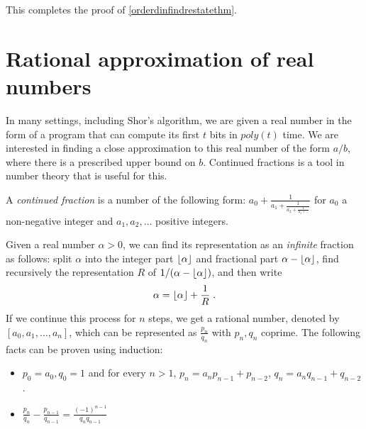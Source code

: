 This completes the proof of \cref{orderdinfindrestatethm}.

\section{Rational approximation of real
numbers}\label{21-Rational-approximation}

In many settings, including Shor's algorithm, we are given a real number
in the form of a program that can compute its first \(t\) bits in
\(poly(t)\) time. We are interested in finding a close approximation to
this real number of the form \(a/b\), where there is a prescribed upper
bound on \(b\). Continued fractions is a tool in number theory that is
useful for this.

A \emph{continued fraction} is a number of the following form:
\(a_0 + \frac{1}{a_1 + \frac{1}{a_2 + \tfrac{1}{a_3 + \ldots}} }\) for
\(a_0\) a non-negative integer and \(a_1,a_2,\ldots\) positive integers.

Given a real number \(\alpha>0\), we can find its representation as an
\emph{infinite} fraction as follows: split \(\alpha\) into the integer
part \(\lfloor \alpha \rfloor\) and fractional part \(\alpha - \lfloor \alpha \rfloor\),
find recursively the representation \(R\) of
\(1/(\alpha - \lfloor \alpha \rfloor)\), and then write
\begin{equation*}
\alpha = \lfloor \alpha \rfloor + \frac{1}{R} \;.
\end{equation*}
If we continue this process for \(n\) steps, we get a rational number,
denoted by \([a_0,a_1,\ldots,a_n]\), which can be represented as
\(\tfrac{p_n}{q_n}\) with \(p_n,q_n\) coprime. The following facts can
be proven using induction:

\begin{itemize}
\item
  \(p_0=a_0, q_0 =1\) and for every \(n>1\),
  \(p_n = a_np_{n-1} + p_{n-2}\), \(q_n = a_nq_{n-1} + q_{n-2}\).
\item
  \(\tfrac{p_n}{q_n} - \tfrac{p_{n-1}}{q_{n-1}} = \tfrac{(-1)^{n-1}}{q_nq_{n-1}}\)
\end{itemize}

